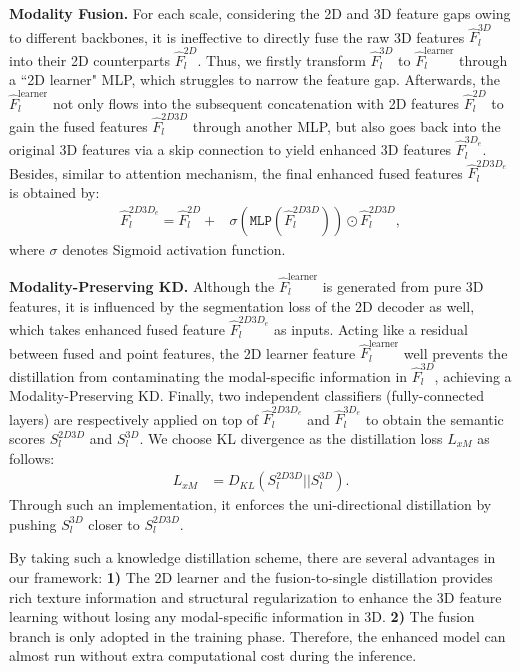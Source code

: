 \documentclass[runningheads]{llncs}
\begin{document}
    \noindent\textbf{Modality Fusion.}
	For each scale, considering the 2D and 3D feature gaps owing to different backbones, it is ineffective to directly fuse the raw 3D features $\hat{F}^{3D}_l$ into their 2D counterparts $\hat{F}^{2D}_l$.
Thus, we firstly transform $\hat{F}^{3D}_l$ to $\hat{F}^{{{\text{learner}}}}_l$ through a ``2D learner" MLP, which struggles to narrow the feature gap.
Afterwards, the $\hat{F}^{{{\text{learner}}}}_l$ not only flows into the subsequent concatenation with 2D features $\hat{F}^{2D}_l$ to gain the fused features $\hat{F}^{2D3D}_l$ through another MLP, but also goes back into the original 3D features via a skip connection to yield enhanced 3D features $\hat{F}^{3D_{e}}_l$.
Besides, similar to attention mechanism, the final enhanced fused features $\hat{F}^{2D3D_e}_l$ is obtained by:
	\begin{align}
\hat{F}^{2D3D_e}_l = \hat{F}^{2D}_l +& \sigma(\texttt{MLP}(\hat{F}^{2D3D}_l)) \odot  \hat{F}^{2D3D}_l,
	\label{fuse}
	\end{align}
	where $\sigma$ denotes Sigmoid activation function.
	
	\noindent\textbf{Modality-Preserving KD.} Although the $\hat{F}^{{{\text{learner}}}}_l$ is generated from pure 3D features, it is influenced by the segmentation loss of the 2D decoder as well, which takes enhanced fused feature $\hat{F}^{2D3D_e}_l$ as inputs.
Acting like a residual between fused and point features, the 2D learner feature $\hat{F}^{{{\text{learner}}}}_l$ well prevents the distillation from contaminating the modal-specific information in $\hat{F}^{3D}_l$, achieving a Modality-Preserving KD.
Finally, two independent classifiers (fully-connected layers) are respectively applied on top of $\hat{F}^{2D3D_e}_l$ and $\hat{F}^{3D_{e}}_l$ to obtain the semantic scores $S^{2D3D}_l$ and $S^{3D}_l$.
We choose KL divergence as the distillation loss $L_{xM}$ as follows:
\begin{align}
	L_{xM} &= D_{KL}(S^{2D3D}_l||S^{3D}_l).
\label{kl}
	\end{align}
Through such an implementation, it enforces the uni-directional distillation by pushing $S^{3D}_{l}$ closer to $S^{2D3D}_l$.

	
	By taking such a knowledge distillation scheme, there are several advantages in our framework:
\textbf{1)} The 2D learner and the fusion-to-single distillation provides rich texture information and structural regularization to enhance the 3D feature learning without losing any modal-specific information in 3D.
\textbf{2)} The fusion branch is only adopted in the training phase. Therefore, the enhanced model can almost run without extra computational cost during the inference.
	
\end{document}
